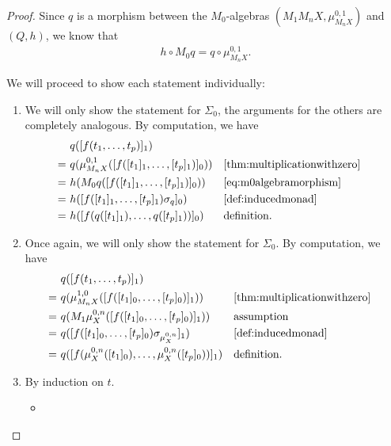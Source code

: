 \documentclass[11pt,a4paper]{amsart}
\newcommand{\sigp}{\Sigma_0}
\theoremstyle{plain}
\numberwithin{equation}{section}
\newcommand{\+}[1]{\mathcal{#1}\xspace}
\theoremstyle{definition}
\begin{document}
\begin{proof}
    Since \(q\) is a morphism between the \(M_0\)-algebras \((M_1 M_n X, \mu^{0, 1}_{M_n X})\) and \((Q, h)\), we know that
    \begin{align}
        h \circ M_0 q = q \circ \mu^{0, 1}_{M_n X}. \label{eq:m0algebramorphism}
    \end{align}

    We will proceed to show each statement individually:
    \begin{enumerate}[wide]
        \item
            We will only show the statement for \(\sigp\), the arguments for the others are completely analogous.
            By computation, we have
            \begin{align*}
                &q([f(t_1, \ldots, t_p)]_1) \\
                =~&q(\mu^{0, 1}_{M_n X}([f([t_1]_1, \ldots, [t_p]_1)]_0)) && \text{\cref{thm:multiplicationwithzero}} \\
                =~&h(M_0 q([f([t_1]_1, \ldots, [t_p]_1)]_0)) && \text{\cref{eq:m0algebramorphism}} \\
                =~&h([f([t_1]_1, \ldots, [t_p]_1)\sigma_q]_0) && \text{\cref{def:inducedmonad}} \\
                =~&h([f(q([t_1]_1), \ldots, q([t_p]_1))]_0) && \text{definition}.
            \end{align*}
        \item
            Once again, we will only show the statement for \(\sigp\).
            By computation, we have
            \begin{align*}
                &q([f(t_1, \ldots, t_p)]_1) \\
                =~&q(\mu^{1, 0}_{M_n X}([f([t_1]_0, \ldots, [t_p]_0)]_1)) && \text{\cref{thm:multiplicationwithzero}} \\
                =~&q(M_1 \mu^{0, n}_X([f([t_1]_0, \ldots, [t_p]_0)]_1)) && \text{assumption} \\
                =~&q([f([t_1]_0, \ldots, [t_p]_0) \sigma_{\mu^{0, n}_X}]_1) && \text{\cref{def:inducedmonad}} \\
                =~&q([f(\mu^{0, n}_X([t_1]_0), \ldots, \mu^{0, n}_X([t_p]_0))]_1) && \text{definition}.
            \end{align*}
        \item
            By induction on \(t\).
            \begin{itemize}
                \item

\end{itemize}
\end{enumerate}
\end{proof}
\end{document}
